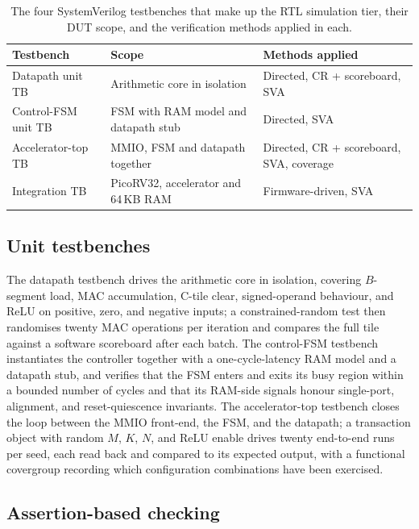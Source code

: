 \begin{table}[htbp]
  \centering
  \small
  \setlength{\tabcolsep}{5pt}
  \begin{tabular}{llp{3cm}}
  \toprule
  Testbench & Scope & Methods applied \\
  \midrule
  Datapath unit TB    & Arithmetic core in isolation       & Directed, CR + scoreboard, SVA \\
  Control-FSM unit TB & FSM with RAM model and datapath stub & Directed, SVA \\
  Accelerator-top TB  & MMIO, FSM and datapath together    & Directed, CR + scoreboard, SVA, coverage \\
  Integration TB      & PicoRV32, accelerator and 64\,KB RAM & Firmware-driven, SVA \\
  \bottomrule
  \end{tabular}
  \caption{The four SystemVerilog testbenches that make up the RTL
           simulation tier, their DUT scope, and the verification
           methods applied in each.}
  \label{tab:testbenches}
\end{table}

\subsection{Unit testbenches}

The datapath testbench drives the arithmetic core in isolation, covering
$B$-segment load, MAC accumulation, C-tile clear, signed-operand
behaviour, and ReLU on positive, zero, and negative inputs; a
constrained-random test then randomises twenty MAC operations per
iteration and compares the full tile against a software scoreboard after
each batch. The control-FSM testbench instantiates the controller
together with a one-cycle-latency RAM model and a datapath stub, and
verifies that the FSM enters and exits its busy region within a bounded
number of cycles and that its RAM-side signals honour single-port,
alignment, and reset-quiescence invariants. The accelerator-top
testbench closes the loop between the MMIO front-end, the FSM, and the
datapath; a transaction object with random $M$, $K$, $N$, and ReLU
enable drives twenty end-to-end runs per seed, each read back and
compared to its expected output, with a functional covergroup recording
which configuration combinations have been exercised.

\subsection{Assertion-based checking}

